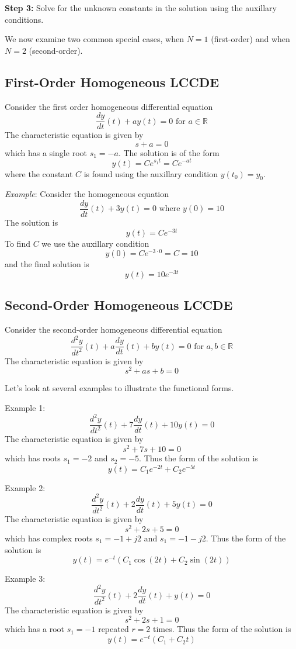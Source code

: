 \textbf{Step 3:} Solve for the unknown constants in the solution using the auxillary conditions. 

We now examine two common special cases, when $N=1$ (first-order) and when $N=2$ (second-order).

\subsection*{First-Order Homogeneous LCCDE}

Consider the first order homogeneous differential equation
\[
\frac{dy}{dt}(t) + ay(t) = 0 \mbox{ for } a \in \mathbb{R}
\]
The characteristic equation is given by
\[
s + a = 0
\]
which has a single root $s_1 = -a$. The solution is of the form
\[
y(t) = Ce^{s_1 t} = Ce^{-a t} 
\]
where the constant $C$ is found using the auxillary condition $y(t_0) = y_0$.

\textit{Example}: Consider the homogeneous equation
\[
\frac{dy}{dt}(t) + 3y(t) = 0 \mbox{ where } y(0) = 10
\]
The solution is
\[
y(t) = Ce^{-3 t} 
\]
To find $C$ we use the auxillary condition
\[
y(0) = Ce^{-3 \cdot 0} = C = 10
\]
and the final solution is
\[
y(t) = 10e^{-3 t} 
\]
\subsection*{Second-Order Homogeneous LCCDE}

Consider the second-order homogeneous differential equation
\[
\frac{d^2y}{dt^2}(t) + a\frac{dy}{dt}(t) + by(t) = 0 \mbox{ for } a,b \in \mathbb{R}
\]
The characteristic equation is given by
\[
s^2 + as + b = 0
\]

Let's look at several examples to illustrate the functional forms.

Example 1:
\[
\frac{d^2y}{dt^2}(t) + 7\frac{dy}{dt}(t) + 10y(t) = 0 
\]
The characteristic equation is given by
\[
s^2 + 7s + 10 = 0
\]
which has roots $s_1 = -2$ and $s_2 = -5$. Thus the form of the solution is
\[
y(t) = C_1e^{-2t} + C_2e^{-5t}
\]

Example 2:
\[
\frac{d^2y}{dt^2}(t) + 2\frac{dy}{dt}(t) + 5y(t) = 0 
\]
The characteristic equation is given by
\[
s^2 + 2s + 5 = 0
\]
which has complex roots $s_1 = -1+j2$ and $s_1 = -1-j2$. Thus the form of the solution is
\[
y(t) = e^{-t}\left(C_1\cos(2t) + C_2\sin(2t)\right)
\]

Example 3:
\[
\frac{d^2y}{dt^2}(t) + 2\frac{dy}{dt}(t) + y(t) = 0 
\]
The characteristic equation is given by
\[
s^2 + 2s + 1 = 0
\]
which has a root $s_1 = -1$ repeated $r=2$ times. Thus the form of the solution is
\[
y(t) = e^{-t}\left(C_1 + C_2t\right)
\]

